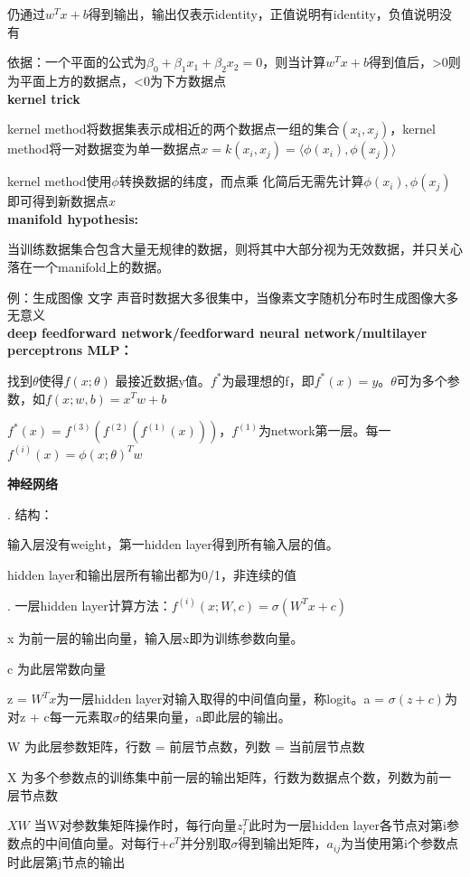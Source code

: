 \documentclass[UTF8]{ctexart}
\begin{document}
  仍通过$w^Tx+b$得到输出，输出仅表示identity，正值说明有identity，负值说明没有

  依据：一个平面的公式为$\beta_0+\beta_1x_1+\beta_2x_2=0$，则当计算$w^Tx+b$得到值后，>0则为平面上方的数据点，<0为下方数据点\\
\textbf{kernel trick}

  kernel method将数据集表示成相近的两个数据点一组的集合$(x_i, x_j)$，kernel method将一对数据变为单一数据点$x=k(x_i, x_j)=\langle \phi (x_i), \phi (x_j)\rangle $

  kernel method使用$\phi $转换数据的纬度，而点乘 化简后无需先计算$\phi (x_i), \phi (x_j)$即可得到新数据点$x$\\
\textbf{manifold hypothesis:}

  当训练数据集合包含大量无规律的数据，则将其中大部分视为无效数据，并只关心落在一个manifold上的数据。

  例：生成图像 文字 声音时数据大多很集中，当像素文字随机分布时生成图像大多无意义\\
\textbf{deep feedforward network/feedforward neural network/multilayer perceptrons MLP：}

  找到$\theta$使得$f(x; \theta )$ 最接近数据y值。$f^*$为最理想的f，即$f^*(x) = y$。$\theta $可为多个参数，如$f(x; w, b) = x^Tw+b$

  $f^*(x) = f^{(3)}(f^{(2)}(f^{(1)}(x)))$，$f^{(1)}$为network第一层。每一$f^{(i)}(x) = \phi (x; \theta )^Tw$

  \textbf{神经网络}

  . 结构：

  \quad \quad 输入层没有weight，第一hidden layer得到所有输入层的值。

  \quad \quad hidden layer和输出层所有输出都为0/1，非连续的值

  . 一层hidden layer计算方法：$ f^{(i)}(x; W, c) = \sigma (W^Tx + c)$

  \quad \quad x 为前一层的输出向量，输入层x即为训练参数向量。 

  \quad \quad c 为此层常数向量

  \quad \quad z = $W^Tx$为一层hidden layer对输入取得的中间值向量，称logit。a = $\sigma (z + c)$为对z + c每一元素取$\sigma $的结果向量，a即此层的输出。

  \quad \quad W 为此层参数矩阵，行数 = 前层节点数，列数 = 当前层节点数

  \quad \quad X 为多个参数点的训练集中前一层的输出矩阵，行数为数据点个数，列数为前一层节点数

  \quad \quad $XW$ 当W对参数集矩阵操作时，每行向量$z_{i}^T$此时为一层hidden layer各节点对第i参数点的中间值向量。对每行+$c^T$并分别取$\sigma $得到输出矩阵，$a_{ij}$为当使用第i个参数点时此层第j节点的输出
\end{document}
